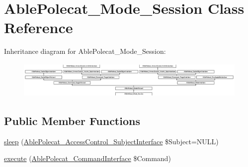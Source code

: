 \hypertarget{class_able_polecat___mode___session}{}\section{Able\+Polecat\+\_\+\+Mode\+\_\+\+Session Class Reference}
\label{class_able_polecat___mode___session}
Inheritance diagram for Able\+Polecat\+\_\+\+Mode\+\_\+\+Session\+:\begin{figure}[H]
\begin{center}
\leavevmode
\includegraphics[height=1.806452cm]{class_able_polecat___mode___session}
\end{center}
\end{figure}
\subsection*{Public Member Functions}
\begin{DoxyCompactItemize}
\item 
\hyperlink{class_able_polecat___mode___session_a365e24d7b066205cafa2a5cce3a4f224}{sleep} (\hyperlink{interface_able_polecat___access_control___subject_interface}{Able\+Polecat\+\_\+\+Access\+Control\+\_\+\+Subject\+Interface} \$Subject=N\+U\+L\+L)
\item 
\hyperlink{class_able_polecat___mode___session_aa7f01cbd17bffdbbb7511a3c37756064}{execute} (\hyperlink{interface_able_polecat___command_interface}{Able\+Polecat\+\_\+\+Command\+Interface} \$Command)
\end{DoxyCompactItemize}
